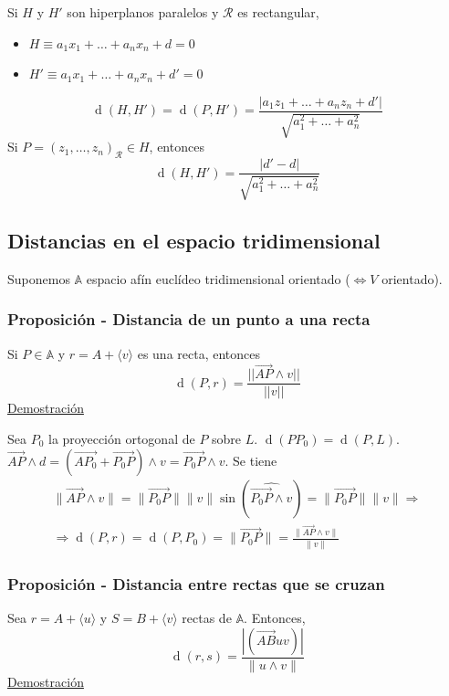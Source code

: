 \documentclass[12pt, a4paper, ones, notitlepage, openany,titlepage]{article}
\newcommand{\demostracion}{\noindent\underline{Demostración}}
\newcommand{\distancia}[1]{\operatorname{d}(#1)}
\begin{document}
Si $H$ y $H'$ son hiperplanos paralelos y $\mathcal{R}$ es rectangular,
\begin{itemize}
	\item $H \equiv a_1 x_1 + \ldots + a_n x_n + d = 0$
	\item $H' \equiv a_1 x_1 + \ldots + a_n x_n + d' = 0$
\end{itemize}
$$
\distancia{H,H'} = \distancia{P,H'} = \frac{|a_1 z_1 + \ldots + a_n z_n + d'|}{\sqrt{a_1^2 + \ldots + a_n^2}}
$$
Si $P = (z_1, \ldots, z_n)_\mathcal{R} \in H$, entonces
$$
\distancia{H,H'} = \frac{|d' - d|}{\sqrt{a_1^2 + \ldots + a_n^2}}
$$

\subsection{Distancias en el espacio tridimensional}
Suponemos $\mathbb{A}$ espacio afín euclídeo tridimensional orientado ($\Longleftrightarrow V$ orientado).

\subsubsection{Proposición - Distancia de un punto a una recta}
Si $P \in \mathbb{A}$ y $r = A + \langle v \rangle$ es una recta, entonces
$$
\distancia{P,r} = \frac{||\overrightarrow{AP} \wedge v||}{||v||}
$$
\demostracion

Sea $P_0$ la proyección ortogonal de $P$ sobre $L$. $\distancia{PP_0} = \distancia{P,L}$. $\overrightarrow{AP} \wedge d = (\overrightarrow{AP_0} + \overrightarrow{P_0P}) \wedge v = \overrightarrow{P_0P} \wedge v$. Se tiene
\begin{gather*}
	\|\overrightarrow{AP} \wedge v\| = \|\overrightarrow{P_0P}\| \|v\| \sin(\widehat{\overrightarrow{P_0P} \wedge v}) = \|\overrightarrow{P_0P}\| \|v\| \Longrightarrow \\
	\Longrightarrow \distancia{P,r} = \distancia{P,P_0} = \|\overrightarrow{P_0P}\| = \frac{\|\overrightarrow{AP} \wedge v\|}{\|v\|}
\end{gather*}

\subsubsection{Proposición - Distancia entre rectas que se cruzan}
Sea $r = A + \langle u \rangle$ y $S = B + \langle v \rangle$ rectas de $\mathbb{A}$. Entonces,
$$
\distancia{r,s} = \frac{|(\overrightarrow{AB} u v)|}{\|u \wedge v\|}
$$
\demostracion
\end{document}

